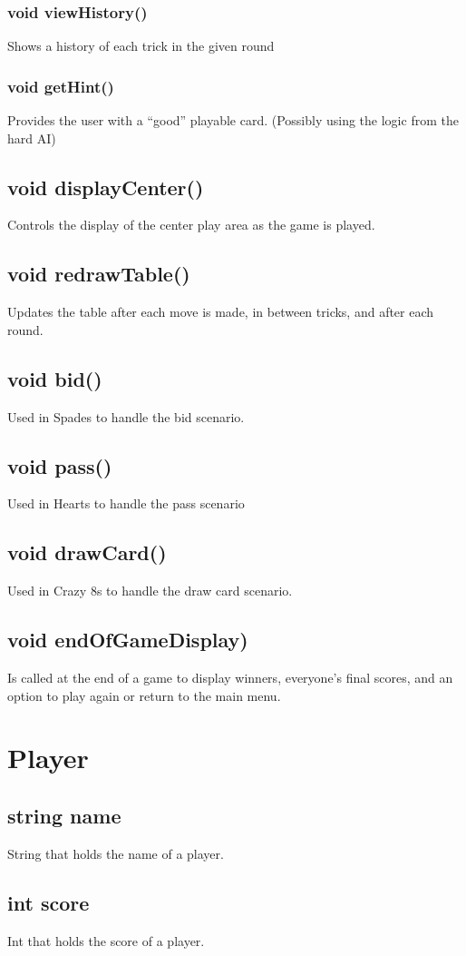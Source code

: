 \documentclass[]{scrartcl}
\begin{document}
	\subsubsection{void viewHistory()}
		Shows a history of each trick in the given round
	\subsubsection{void getHint()}
		Provides the user with a “good” playable card. (Possibly using the logic from the hard AI)
\subsection{void displayCenter()}
	Controls the display of the center play area as the game is played.
\subsection{void redrawTable()}
	Updates the table after each move is made, in between tricks, and after each round.
\subsection{void bid()}
	Used in Spades to handle the bid scenario.
\subsection{void pass()}
	Used in Hearts to handle the pass scenario
\subsection{void drawCard()}
	Used in Crazy 8s to handle the draw card scenario.
\subsection{void endOfGameDisplay)}
	Is called at the end of a game to display winners, everyone’s final scores, and an option to play again or return to the main menu.


\section{Player}

\subsection{string name}
	String that holds the name of a player.
\subsection{int score}
	Int that holds the score of a player.
\end{document}
